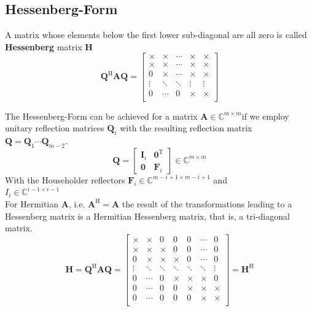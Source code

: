\documentclass[english]{latex4ei/latex4ei_sheet}
\begin{document}
\begin{sectionbox}
    \subsection{Hessenberg-Form}
    A matrix whose elements below the first lower sub-diagonal are all zero is called \textbf{Hessenberg} matrix $\mathbf{H}$
    $$\mathbf{Q}^\text{H}\mathbf{A}\mathbf{Q} = \begin{bmatrix}
            \times & \times & \cdots & \times & \times \\
            \times & \times & \cdots & \times & \times \\
            0      & \times & \cdots & \times & \times \\
            \vdots & \ddots & \ddots & \vdots & \vdots \\
            0      & \cdots & 0      & \times & \times \\
        \end{bmatrix}$$

    The Hessenberg-Form can be achieved for a matrix $\mathbf{A}\in\mathbb{C}^{m\times m}$if we employ unitary reflection matrices $\mathbf{Q}_i$ with the resulting reflection matrix $\mathbf{Q}=\mathbf{Q}_1\cdots\mathbf{Q}_{m-2}$.
    $$\mathbf{Q} = \begin{bmatrix}
            \mathbf{I}_i & \mathbf{0}^\text{T} \\
            \mathbf{0}   & \mathbf{F}_i
        \end{bmatrix} \in \mathbb{C}^{m\times m}$$
    With the Householder reflectors $\mathbf{F}_i\in\mathbb{C}^{m-i+1\times m-i+1}$ and\\
    $I_i\in\mathbb{C}^{i-1\times i-1}$\\

    For Hermitian $\mathbf{A}$, i.e. $\mathbf{A}^\text{H}=\mathbf{A}$ the result of the transformations leading to a Hessenberg matrix is a Hermitian Hessenberg matrix, that is, a tri-diagonal matrix.
    $$\mathbf{H} = \mathbf{Q}^\text{H} \mathbf{A}\mathbf{Q}=
        \begin{bmatrix}
            \times & \times & 0      & 0      & 0      & \cdots & 0      \\
            \times & \times & \times & 0      & 0      & \cdots & 0      \\
            0      & \times & \times & \times & 0      & \cdots & 0      \\
            \vdots & \ddots & \ddots & \ddots & \ddots & \ddots & \vdots \\
            0      & \cdots & 0      & \times & \times & \times & 0      \\
            0      & \cdots & 0      & 0      & \times & \times & \times \\
            0      & \cdots & 0      & 0      & 0      & \times & \times \\
        \end{bmatrix} = \mathbf{H}^\text{H}$$
\end{sectionbox}
\end{document}
